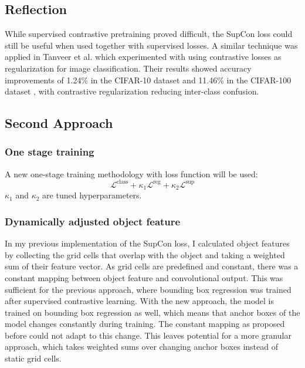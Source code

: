 \documentclass[12pt,a4paper,twoside,openany]{report}
\newcommand{\suploss}{\mathcal{L}^\text{sup}}
\newcommand{\clsloss}{\mathcal{L}^\text{class}}
\newcommand{\regloss}{\mathcal{L}^\text{reg}}
\begin{document}
\subsection{Reflection}
While supervised contrastive pretraining proved difficult, the SupCon loss could still be useful when used together with supervised losses. A similar technique was applied in Tanveer et al. \cite{tanveer_regularization_2021} which experimented with using contrastive losses as regularization for image classification. Their results showed accuracy improvements of 1.24\% in the CIFAR-10 dataset and 11.46\% in the CIFAR-100 dataset \cite{noauthor_cifar-10_nodate}, with contrastive regularization reducing inter-class confusion. 

\subsection{Second Approach} \label{section: final supcon loss}
\subsubsection{One stage training}
A new one-stage training methodology with loss function will be used:
$$
\clsloss + \kappa_1 \regloss + \kappa_2 \suploss
$$
$\kappa_1$ and $\kappa_2$ are tuned hyperparameters.

\subsubsection{Dynamically adjusted object feature}
In my previous implementation of the SupCon loss, I calculated object features by collecting the grid cells that overlap with the object and taking a weighted sum of their feature vector. As grid cells are predefined and constant, there was a constant mapping between object feature and convolutional output. This was sufficient for the previous approach, where bounding box regression was trained after supervised contrastive learning. With the new approach, the model is trained on bounding box regression as well, which means that anchor boxes of the model changes constantly during training. The constant mapping as proposed before could not adapt to this change. This leaves potential for a more granular approach, which takes weighted sums over changing anchor boxes instead of static grid cells.
\end{document}
